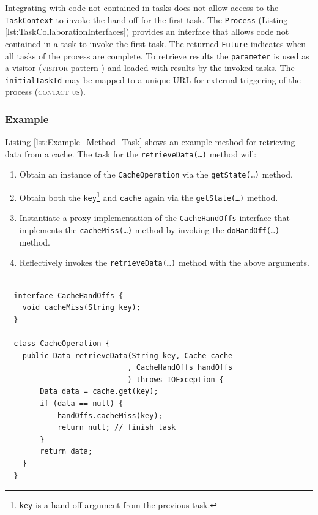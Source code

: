 \documentclass[prodmode]{style/acmlarge}
\begin{document}
Integrating with code not contained in tasks does not allow access to the
\texttt{TaskContext} to invoke the hand-off for the first task.  The
\texttt{Process} (Listing \ref{lst:TaskCollaborationInterfaces}) provides an
interface that allows code not contained in a task to invoke the first task.
The returned \texttt{Future} indicates when all tasks of the process are
complete.  To retrieve results the \texttt{parameter} is used as a visitor
(\textsc{visitor} pattern \cite{gof}) and loaded with results by the invoked
tasks.  The \texttt{initialTaskId} may be mapped to a unique URL for external
triggering of the process (\textsc{contact us}).



\subsubsection*{Example}

Listing \ref{lst:Example_Method_Task} shows an example method for retrieving
data from a cache.  The task for the \texttt{retrieve\-Data(\ldots)} method will:
\begin{enumerate}
  \item Obtain an instance of the \texttt{CacheOperation} via the \texttt{getState(\ldots)} method.
  \item Obtain both the \texttt{key}\footnote{\texttt{key} is a hand-off argument from the previous task.} and \texttt{cache} again via the \texttt{getState(\ldots)} method.
  \item Instantiate a proxy implementation of the \texttt{CacheHandOffs} interface that implements the \texttt{cacheMiss(\ldots)} method by invoking the \texttt{doHandOff(\ldots)} method. 
  \item Reflectively invokes the \texttt{retrieveData(\ldots)} method with the above arguments.
\end{enumerate}

\lstset{caption=Example developer code of a task for retrieving data from a cache\protect\footnotemark}
\begin{lstlisting}[float,label=lst:Example_Method_Task]

  interface CacheHandOffs {
    void cacheMiss(String key);
  }

  class CacheOperation {
    public Data retrieveData(String key, Cache cache
                            , CacheHandOffs handOffs
                            ) throws IOException {
        Data data = cache.get(key);
        if (data == null) {
            handOffs.cacheMiss(key);
            return null; // finish task
        }
        return data;
    }
  }
\end{lstlisting}
\end{document}
